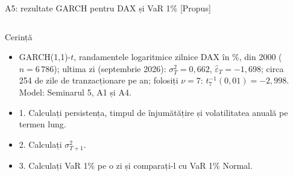 \begin{frame}{A5: rezultate GARCH pentru DAX și VaR 1\% [Propus]}
\propsub
\itemsize{\scriptsize}
\begin{columns}[T]
\begin{column}{\taskw}
\begin{block}{Cerință}
\begin{center}
\scriptsize
{}
\end{center}
\begin{itemize}
    \item GARCH(1,1)-$t$, randamentele logaritmice zilnice DAX în \%, din 2000 ($n = 6\,786$); ultima zi (septembrie 2026): $\sigma_T^2 = 0{,}662$, $\hat\varepsilon_T = \ensuremath{-}1{,}698$; circa 254 de zile de tranzacționare pe an; folosiți $\nu = 7$: $t_{7}^{-1}(0{,}01) = \ensuremath{-}2{,}998$. Model: Seminarul 5, A1 și A4.
    \item 1. Calculați persistența, timpul de înjumătățire și volatilitatea anuală pe termen lung.
    \item 2. Calculați $\sigma_{T+1}^2$.
    \item 3. Calculați VaR 1\% pe o zi și comparați-l cu VaR 1\% Normal.
\end{itemize}
\end{block}
\end{column}
\begin{column}{\solw}
\end{column}
\end{columns}
\end{frame}


